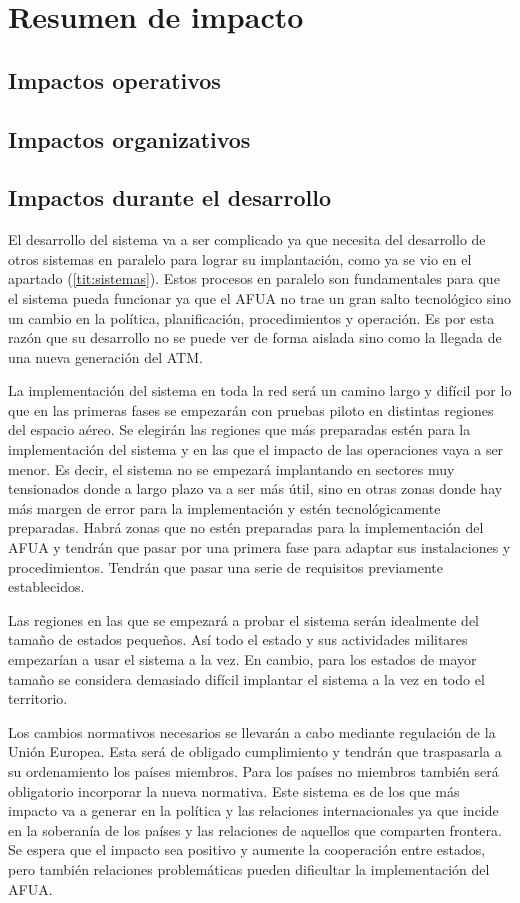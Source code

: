 \section{Resumen de impacto}

\subsection{Impactos operativos}

\subsection{Impactos organizativos}

\subsection{Impactos durante el desarrollo}

El desarrollo del sistema va a ser complicado ya que necesita del desarrollo de otros sistemas en paralelo para lograr su implantación, como ya se vio en el apartado (\ref{tit:sistemas}). Estos procesos en paralelo son fundamentales para que el sistema pueda funcionar ya que el AFUA no trae un gran salto tecnológico sino un cambio en la política, planificación, procedimientos y operación. Es por esta razón que su desarrollo no se puede ver de forma aislada sino como la llegada de una nueva generación del ATM.

La implementación del sistema en toda la red será un camino largo y difícil por lo que en las primeras fases se empezarán con pruebas piloto en distintas regiones del espacio aéreo. Se elegirán las regiones que más preparadas estén para la implementación del sistema y en las que el impacto de las operaciones vaya a ser menor. Es decir, el sistema no se empezará implantando en sectores muy tensionados donde a largo plazo va a ser más útil, sino en otras zonas donde hay más margen de error para la implementación y estén tecnológicamente preparadas. Habrá zonas que no estén preparadas para la implementación del AFUA y tendrán que pasar por una primera fase para adaptar sus instalaciones y procedimientos. Tendrán que pasar una serie de requisitos previamente establecidos.

Las regiones en las que se empezará a probar el sistema serán idealmente del tamaño de estados pequeños. Así todo el estado y sus actividades militares empezarían a usar el sistema a la vez. En cambio, para los estados de mayor tamaño se considera demasiado difícil implantar el sistema a la vez en todo el territorio.

Los cambios normativos necesarios se llevarán a cabo mediante regulación de la Unión Europea. Esta será de obligado cumplimiento y tendrán que traspasarla a su ordenamiento los países miembros. Para los países no miembros también será obligatorio incorporar la nueva normativa. Este sistema es de los que más impacto va a generar en la política y las relaciones internacionales ya que incide en la soberanía de los países y las relaciones de aquellos que comparten frontera. Se espera que el impacto sea positivo y aumente la cooperación entre estados, pero también relaciones problemáticas pueden dificultar la implementación del AFUA.
